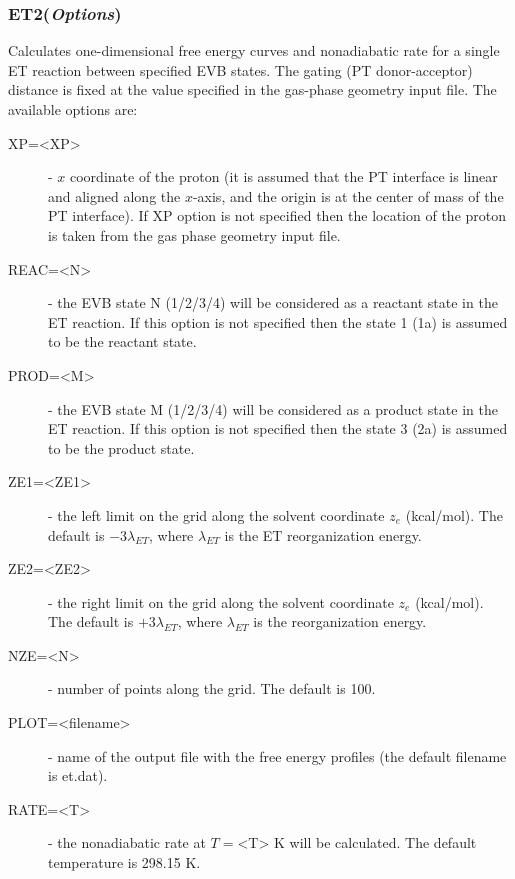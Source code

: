 \documentclass[oneside,11pt,openany]{book}
\newcommand{\tw}{\ttfamily}
\begin{document}
\subsubsection*{ET2({\it Options})}
%
Calculates one-dimensional free energy curves and nonadiabatic rate
for a single ET reaction between specified EVB states. The gating
(PT donor-acceptor) distance is fixed at the value specified
in the gas-phase geometry input file. The available options are:
\begin{description}

\item[{\tw XP=<XP>}] - $x$ coordinate of the proton (it is assumed that the
          PT interface is linear and aligned along the $x$-axis,
          and the origin is at the center of mass of the PT interface).
          If {\tw XP} option is not specified then the location
          of the proton is taken from the gas phase geometry input file.

\item[{\tw REAC=<N>}] - the EVB state {\tw N} (1/2/3/4) will be considered
           as a reactant state in the ET reaction. If this
           option is not specified then the state 1 (1a)
           is assumed to be the reactant state.

\item[{\tw PROD=<M>}] - the EVB state {\tw M} (1/2/3/4) will be considered
           as a product state in the ET reaction. If this
           option is not specified then the state 3 (2a)
           is assumed to be the product state.

\item[{\tw ZE1=<ZE1>}] - the left limit on the grid along the solvent
            coordinate $z_e$ (kcal/mol). The default is
            $-3\lambda_{ET}$, where $\lambda_{ET}$ is the
            ET reorganization energy.

\item[{\tw ZE2=<ZE2>}] - the right limit on the grid along the solvent
            coordinate $z_e$ (kcal/mol). The default is
            $+3\lambda_{ET}$, where $\lambda_{ET}$ is the
            reorganization energy.

\item[{\tw NZE=<N>}] - number of points along the grid. The default is 100.

\item[{\tw PLOT=<filename>}] - name of the output file with the free energy
                  profiles (the default filename is {\tw et.dat}).

\item[{\tw RATE=<T>}] - the nonadiabatic rate at $T=${\tw <T>} K
                        will be calculated. The default temperature
                        is 298.15 K.

\end{description}
\end{document}
